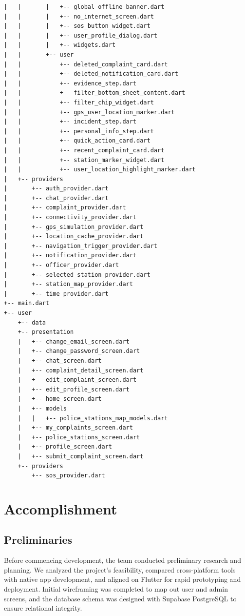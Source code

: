 \documentclass[12pt, a4paper, twoside]{report}
\begin{document}
\begin{footnotesize}
\begin{verbatim}
|   |       |   +-- global_offline_banner.dart
|   |       |   +-- no_internet_screen.dart
|   |       |   +-- sos_button_widget.dart
|   |       |   +-- user_profile_dialog.dart
|   |       |   +-- widgets.dart
|   |       +-- user
|   |           +-- deleted_complaint_card.dart
|   |           +-- deleted_notification_card.dart
|   |           +-- evidence_step.dart
|   |           +-- filter_bottom_sheet_content.dart
|   |           +-- filter_chip_widget.dart
|   |           +-- gps_user_location_marker.dart
|   |           +-- incident_step.dart
|   |           +-- personal_info_step.dart
|   |           +-- quick_action_card.dart
|   |           +-- recent_complaint_card.dart
|   |           +-- station_marker_widget.dart
|   |           +-- user_location_highlight_marker.dart
|   +-- providers
|       +-- auth_provider.dart
|       +-- chat_provider.dart
|       +-- complaint_provider.dart
|       +-- connectivity_provider.dart
|       +-- gps_simulation_provider.dart
|       +-- location_cache_provider.dart
|       +-- navigation_trigger_provider.dart
|       +-- notification_provider.dart
|       +-- officer_provider.dart
|       +-- selected_station_provider.dart
|       +-- station_map_provider.dart
|       +-- time_provider.dart
+-- main.dart
+-- user
    +-- data
    +-- presentation
    |   +-- change_email_screen.dart
    |   +-- change_password_screen.dart
    |   +-- chat_screen.dart
    |   +-- complaint_detail_screen.dart
    |   +-- edit_complaint_screen.dart
    |   +-- edit_profile_screen.dart
    |   +-- home_screen.dart
    |   +-- models
    |   |   +-- police_stations_map_models.dart
    |   +-- my_complaints_screen.dart
    |   +-- police_stations_screen.dart
    |   +-- profile_screen.dart
    |   +-- submit_complaint_screen.dart
    +-- providers
        +-- sos_provider.dart
\end{verbatim}
\end{footnotesize}
\chapter{Accomplishment}
\section{Preliminaries}
Before commencing development, the team conducted preliminary research and planning. We analyzed the project's feasibility, compared cross-platform tools with native app development, and aligned on Flutter for rapid prototyping and deployment. Initial wireframing was completed to map out user and admin screens, and the database schema was designed with Supabase PostgreSQL to ensure relational integrity.
\end{document}
